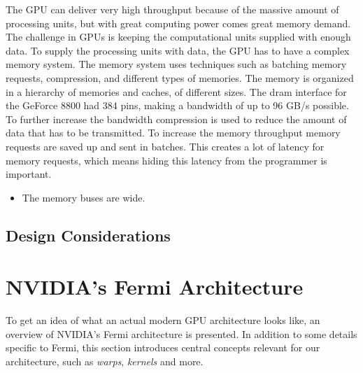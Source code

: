 \documentclass[../main/report.tex]{subfiles}
\begin{document}
The GPU can deliver very high throughput because of the massive amount of processing units, but with great computing power comes great memory demand.
The challenge in GPUs is keeping the computational units supplied with enough data.
To supply the processing units with data, the GPU has to have a complex memory system. 
The memory system uses techniques such as batching memory requests, compression, and different types of memories.
The memory is organized in a hierarchy of memories and caches, of different sizes.
The dram interface for the GeForce 8800 had 384 pins, making a bandwidth of up to 96 GB/s possible.
To further increase the bandwidth compression is used to reduce the amount of data that has to be transmitted.
To increase the memory throughput memory requests are saved up and sent in batches.
This creates a lot of latency for memory requests, which means hiding this latency from the programmer is important.
 
\begin{itemize}
	\item The memory buses are wide.
\end{itemize}


\subsection{Design Considerations}


\section{NVIDIA's Fermi Architecture} %

To get an idea of what an actual modern GPU architecture looks like, an overview of NVIDIA's Fermi architecture is presented.
In addition to some details specific to Fermi, this section introduces central concepts relevant for our architecture, such as \emph{warps}, \emph{kernels} and more.

\end{document}
